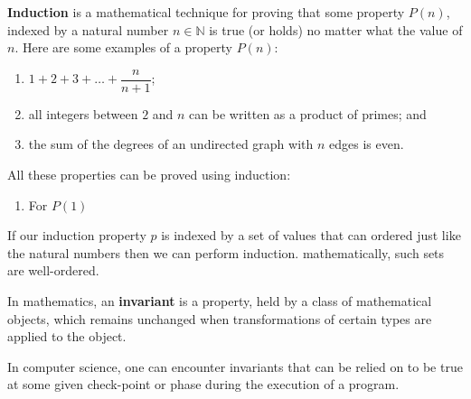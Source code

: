 \begin{definition}
    \textbf{Induction} is a mathematical technique for proving that some property $P(n)$, indexed by a natural number $n\in\mathbb N$ is true (or holds) no matter what the value of $n$. Here are some examples of a property $P(n)$:
    \begin{enumerate}
        \item $1+2+3+\ldots+\dfrac n{n+1}$;
        \item all integers between $2$ and $n$ can be written as a product of primes; and
        \item the sum of the degrees of an undirected graph with $n$ edges is even.
    \end{enumerate}
    All these properties can be proved using induction:
    \begin{enumerate}
        \item For $P(1)$
    \end{enumerate}
\end{definition}

If our induction property $p$ is indexed by a set of values that can ordered just like the natural numbers then we can perform induction. mathematically, such sets are well-ordered.


\begin{definition}
    In mathematics, an \textbf{invariant} is a property, held by a class of mathematical objects, which remains unchanged when transformations of certain types are applied to the object.
    
    In computer science, one can encounter invariants that can be relied on to be true at some given check-point or phase during the execution of a program. 
\end{definition}

